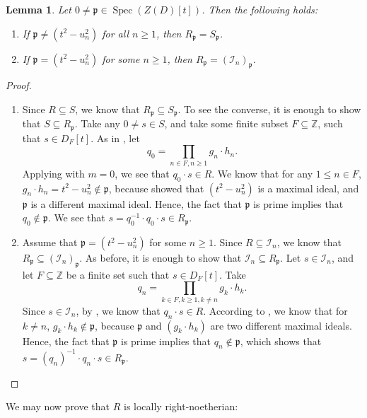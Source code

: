 \documentclass{amsart}
\newtheorem{lem}[equation]{Lemma}
\theoremstyle{definition}
\newcommand{\opn}{\operatorname}
\newcommand{\mfrak}[1]{\mathfrak{#1}}
\newcommand{\p}{\mfrak{p}}
\numberwithin{equation}{section}
\begin{document}
\begin{lem}\label{lem:localizationofR}
Let $0 \ne \p \in \opn{Spec}(Z(D)[t])$.
Then the following holds:
\begin{enumerate}
\item If $\p \ne (t^2-u_n^2)$ for all $n \ge 1$,
then $R_{\p} = S_{\p}$.
\item If $\p = (t^2-u_n^2)$ for some $n \ge 1$,
then $R_{\p} = \left(\mathcal{I}_n\right)_{\p}$.
\end{enumerate}
\end{lem}
\begin{proof}
\quad
\begin{enumerate}
\item Since $R \subseteq S$, 
we know that $R_{\p} \subseteq S_{\p}$.
To see the converse, it is enough to show that $S \subseteq R_{\p}$.
Take any $0 \ne s \in S$,
and take some finite subset $F \subseteq \mathbb{Z}$,
such that $s \in D_F[t]$.
As in ,
let 
\[
q_0 = \prod_{n \in F, n\ge 1} g_n\cdot h_n.
\]
Applying  with $m=0$, 
we see that $q_0\cdot s \in R$.
We know that for any $1 \le n \in F$,
$g_n\cdot h_n = t^2-u_n^2 \notin \p$,
because  showed that $(t^2-u_n^2)$ is a maximal ideal,
and $\p$ is a different maximal ideal.
Hence, the fact that $\p$ is prime implies that $q_0 \notin \p$.
We see that $s = q_0^{-1}\cdot q_0 \cdot s \in R_{\p}$.
\item Assume that $\p = (t^2-u_n^2)$ for some $n \ge 1$.
Since $R \subseteq \mathcal{I}_n$,
we know that $R_{\p} \subseteq \left(\mathcal{I}_n\right)_{\p}$.
As before, it is enough to show that $\mathcal{I}_n \subseteq R_{\p}$.
Let $s \in \mathcal{I}_n$,
and let $F \subseteq \mathbb{Z}$ be a finite set such that $s \in D_F[t]$.
Take
\[
q_n = \prod_{k \in F, k\ge 1, k\ne n} g_k\cdot h_k.
\]
Since $s \in \mathcal{I}_n$, by ,
we know that $q_n\cdot s \in R$.
According to ,
we know that for $k \ne n$, $g_k \cdot h_k \notin \p$,
because $\p$ and $(g_k\cdot h_k)$ are two different maximal ideals.
Hence, the fact that $\p$ is prime implies that $q_n \notin \p$,
which shows that $s = (q_n)^{-1} \cdot q_n \cdot s \in R_{\p}$.
\end{enumerate}
\end{proof}

We may now prove that $R$ is locally right-noetherian:
\end{document}
